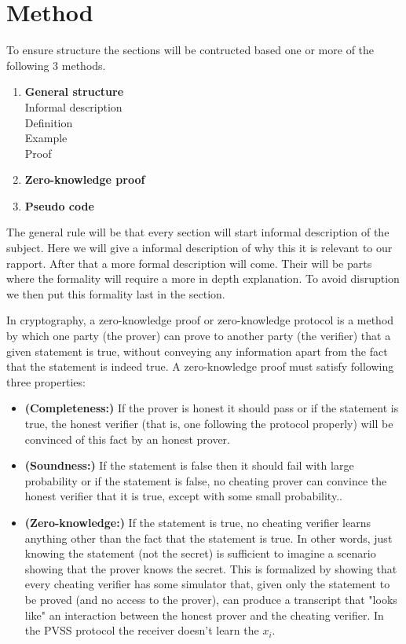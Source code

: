 \section{Method}
To ensure structure the sections will be contructed based one or more of the following 3 methods.
\begin{enumerate}
    \item \textbf{General structure}  \\
    Informal description\\
    Definition\\
    Example\\
    Proof    
    \item \textbf{Zero-knowledge proof}
    \item \textbf{Pseudo code} 
\end{enumerate}

 The general rule will be that every section will start informal description of the subject. Here we will give a informal description of why this it is relevant to our rapport. After that a more formal description will come. Their will be parts where the formality will require a more in depth explanation. To avoid disruption we then put this formality last in the section.    


 In cryptography, a zero-knowledge proof or zero-knowledge protocol is a method by which one party (the prover) can prove to another party (the verifier) that a given statement is true, without conveying any information apart from the fact that the statement is indeed true. A zero-knowledge proof must satisfy following three properties:

\begin{itemize}
\item  \textnormal{\textbf{(Completeness:)}} If the prover is honest it should pass or if the statement is true, the honest verifier (that is, one following the protocol properly) will be convinced of this fact by an honest prover.
\item    \textnormal{\textbf{(Soundness:)}} If the statement is false then it should fail with large probability or if the statement is false, no cheating prover can convince the honest verifier that it is true, except with some small probability..
\item   \textnormal{\textbf{(Zero-knowledge:)}} If the statement is true, no cheating verifier learns anything other than the fact that the statement is true. In other words, just knowing the statement (not the secret) is sufficient to imagine a scenario showing that the prover knows the secret. This is formalized by showing that every cheating verifier has some simulator that, given only the statement to be proved (and no access to the prover), can produce a transcript that "looks like" an interaction between the honest prover and the cheating verifier. In the PVSS protocol the receiver doesn't learn the \begin{math}x_i \end{math}.
\end{itemize}

